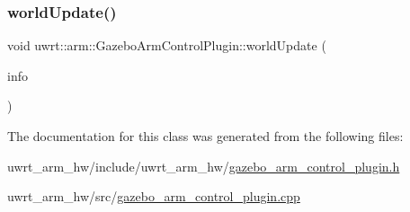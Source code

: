 \subsubsection{\texorpdfstring{world\+Update()}{worldUpdate()}}
{\footnotesize\ttfamily void uwrt\+::arm\+::\+Gazebo\+Arm\+Control\+Plugin\+::world\+Update (\begin{DoxyParamCaption}\item[{const gazebo\+::common\+::\+Update\+Info \&}]{info }\end{DoxyParamCaption})}



The documentation for this class was generated from the following files\+:\begin{DoxyCompactItemize}
\item 
uwrt\+\_\+arm\+\_\+hw/include/uwrt\+\_\+arm\+\_\+hw/\hyperlink{gazebo__arm__control__plugin_8h}{gazebo\+\_\+arm\+\_\+control\+\_\+plugin.\+h}\item 
uwrt\+\_\+arm\+\_\+hw/src/\hyperlink{gazebo__arm__control__plugin_8cpp}{gazebo\+\_\+arm\+\_\+control\+\_\+plugin.\+cpp}\end{DoxyCompactItemize}
